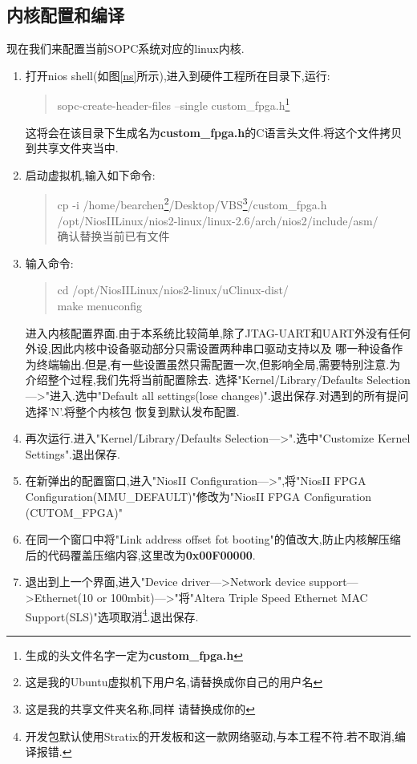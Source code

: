 \documentclass[12pt,a4paper,titlepage]{article}
\begin{document}
\subsection{内核配置和编译}
现在我们来配置当前SOPC系统对应的linux内核.
\begin{enumerate}
\item 打开nios shell(如图\ref{ns}所示),进入到硬件工程所在目录下,运行:
\begin{verse}
sopc-create-header-files --single custom\_fpga.h\footnote{生成的头文件名字一定为\textbf{custom\_fpga.h}}
\end{verse}
这将会在该目录下生成名为\textbf{custom\_fpga.h}的C语言头文件.将这个文件拷贝到共享文件夹当中.
\item 启动虚拟机,输入如下命令:
\begin{verse}
cp -i /home/bearchen\footnote{这是我的Ubuntu虚拟机下用户名,请替换成你自己的用户名}/Desktop/VBS\footnote{这是我的共享文件夹名称,同样
请替换成你的}/custom\_fpga.h /opt/NiosIILinux/nios2-linux/linux-2.6/arch/nios2/include/asm/\\
确认替换当前已有文件
\end{verse}
\item 输入命令:
\begin{verse}
cd /opt/NiosIILinux/nios2-linux/uClinux-dist/\\
make menuconfig\\
\end{verse}
进入内核配置界面.由于本系统比较简单,除了JTAG-UART和UART外没有任何外设,因此内核中设备驱动部分只需设置两种串口驱动支持以及
哪一种设备作为终端输出.但是,有一些设置虽然只需配置一次,但影响全局,需要特别注意.为介绍整个过程,我们先将当前配置除去.
选择"Kernel/Library/Defaults Selection--->"进入.选中"Default all settings(lose changes)".退出保存.对遇到的所有提问选择'N'.将整个内核包
恢复到默认发布配置.
\item 再次运行.进入"Kernel/Library/Defaults Selection--->".选中"Customize Kernel Settings".退出保存.
\item 在新弹出的配置窗口,进入"NiosII Configuration--->",将"NiosII FPGA Configuration(MMU\_DEFAULT)"修改为"NiosII FPGA Configuration
(CUTOM\_FPGA)"
\item 在同一个窗口中将"Link address offset fot booting"的值改大,防止内核解压缩后的代码覆盖压缩内容,这里改为\textbf{0x00F00000}.
\item 退出到上一个界面,进入"Device driver--->Network device support--->Ethernet(10 or 100mbit)--->"将"Altera Triple Speed Ethernet 
MAC Support(SLS)"选项取消\footnote{开发包默认使用Stratix的开发板和这一款网络驱动,与本工程不符.若不取消,编译报错.}.退出保存.

\end{enumerate}
\end{document}
